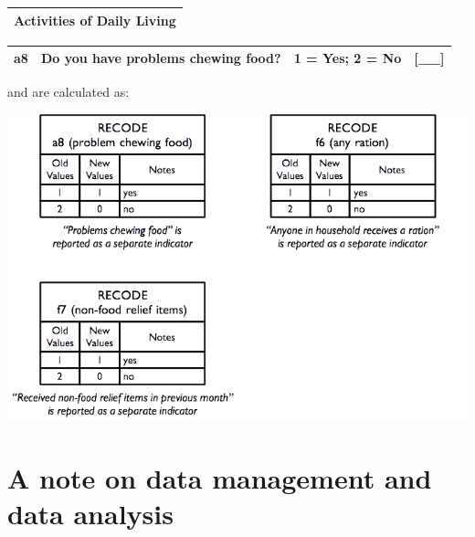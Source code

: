 \documentclass[12pt,a4paper]{book}
\theoremstyle{definition}
\theoremstyle{definition}
\theoremstyle{definition}
\theoremstyle{remark}
\begin{document}
\begin{longtable}[]{@{}c@{}}
\toprule
\begin{minipage}[t]{0.97\columnwidth}\centering
\textbf{Activities of Daily Living}\strut
\end{minipage}\tabularnewline
\bottomrule
\end{longtable}

\begin{longtable}[]{@{}llll@{}}
\toprule
\begin{minipage}[t]{0.09\columnwidth}\raggedright
a8\strut
\end{minipage} & \begin{minipage}[t]{0.41\columnwidth}\raggedright
Do you have problems chewing food?\strut
\end{minipage} & \begin{minipage}[t]{0.25\columnwidth}\raggedright
1 = Yes; 2 = No\strut
\end{minipage} & \begin{minipage}[t]{0.13\columnwidth}\raggedright
{[}\_\_{]}\strut
\end{minipage}\tabularnewline
\bottomrule
\end{longtable}

\newpage

and are calculated as:

\begin{center}\includegraphics{figures/indicators30} \end{center}

\hypertarget{a-note-on-data-management-and-data-analysis}{%
\section{A note on data management and data
analysis}\label{a-note-on-data-management-and-data-analysis}}
\end{document}
